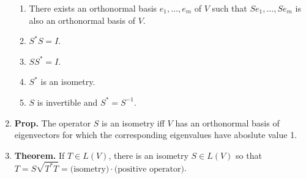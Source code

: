 \begin{enumerate}
\begin{enumerate}
		\item There exists an orthonormal basis $e_1,\dots,e_m$ of $V$ such that $Se_1,\dots,Se_m$ is also an orthonormal basis of $V$. 
		\item $S^*S = I$. 
		\item $SS^* = I$. 
		\item $S^*$ is an isometry. 
		\item $S$ is invertible and $S^* = S^{-1}$. 
	\end{enumerate}
	\item \textbf{Prop. } The operator $S$ is an isometry iff $V$ has an orthonormal basis of eigenvectors for which the corresponding eigenvalues have aboslute value 1. 
	\item \textbf{Theorem. } If $T \in L(V)$, there is an isometry $S \in L(V)$ so that $T = S \sqrt{T^*T} = \textrm{(isometry)} \cdot \textrm{(positive operator)}$. 
\end{enumerate}


